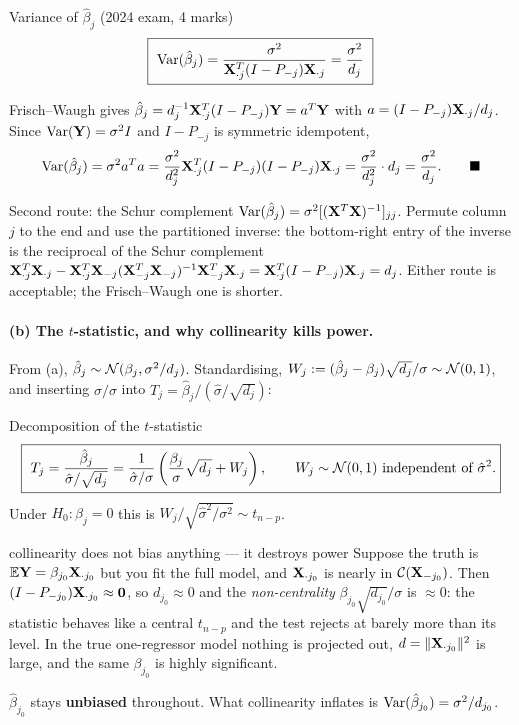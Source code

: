\documentclass[11pt]{article}
\begin{document}
\begin{idea}{Variance of $\hat\beta_j$ (2024 exam, 4 marks)}
\[
  \boxed{\ \Var(\hat\beta_j)=\frac{\sigma^2}{\bX_{\cdot j}^T(I-P_{-j})\bX_{\cdot j}}=\frac{\sigma^2}{d_j}\ }
\]
\end{idea}

\prf Frisch--Waugh gives $\hat\beta_j=d_j^{-1}\mathbf{X}_{\cdot j}^T(I-P_{-j})\mathbf{Y}=a^T\mathbf{Y}$ with
$a=(I-P_{-j})\mathbf{X}_{\cdot j}/d_j$. Since $\operatorname{Var}(\mathbf{Y})=\sigma^2I$ and $I-P_{-j}$ is symmetric
idempotent,
\[
  \operatorname{Var}(\hat\beta_j)=\sigma^2a^Ta
  =\frac{\sigma^2}{d_j^2}\mathbf{X}_{\cdot j}^T(I-P_{-j})(I-P_{-j})\mathbf{X}_{\cdot j}
  =\frac{\sigma^2}{d_j^2}\cdot d_j=\frac{\sigma^2}{d_j}. \qquad\blacksquare
\]

\begin{idea}{Second route: the Schur complement}
$\operatorname{Var}(\hat\beta_j)=\sigma^2[(\mathbf{X}^T\mathbf{X})^{-1}]_{jj}$. Permute column $j$ to the end and use the
partitioned inverse: the bottom-right entry of the inverse is the reciprocal of the Schur
complement
$\mathbf{X}_{\cdot j}^T\mathbf{X}_{\cdot j}-\mathbf{X}_{\cdot j}^T\mathbf{X}_{-j}(\mathbf{X}_{-j}^T\mathbf{X}_{-j})^{-1}\mathbf{X}_{-j}^T\mathbf{X}_{\cdot j}
=\mathbf{X}_{\cdot j}^T(I-P_{-j})\mathbf{X}_{\cdot j}=d_j$. Either route is acceptable; the Frisch--Waugh
one is shorter.
\end{idea}

\paragraph{(b) The $t$-statistic, and why collinearity kills power.}
From (a), $\hat\beta_j\sim\mathcal{N}(\beta_j,\sigma^2/d_j)$. Standardising,
$W_j:=(\hat\beta_j-\beta_j)\sqrt{d_j}/\sigma\sim\mathcal{N}(0,1)$, and inserting $\sigma/\sigma$ into
$T_j=\hat\beta_j/(\hat\sigma/\sqrt{d_j})$:

\begin{idea}{Decomposition of the $t$-statistic}
\[
  \boxed{\ T_j=\frac{\hat\beta_j}{\hat\sigma/\sqrt{d_j}}
   =\frac{1}{\hat\sigma/\sigma}\left(\frac{\beta_j}{\sigma}\sqrt{d_j}+W_j\right),\qquad
   W_j\sim\N(0,1)\ \text{independent of}\ \hat\sigma^2. }
\]
Under $H_0:\beta_j=0$ this is $W_j/\sqrt{\hat\sigma^2/\sigma^2}\sim t_{n-p}$.
\end{idea}

\begin{confusion}{collinearity does not bias anything --- it destroys power}
Suppose the truth is $\mathbb{E}\mathbf{Y}=\beta_{j_0}\mathbf{X}_{\cdot j_0}$ but you fit the full model, and
$\mathbf{X}_{\cdot j_0}$ is nearly in $\mathcal{C}(\mathbf{X}_{-j_0})$. Then
$(I-P_{-j_0})\mathbf{X}_{\cdot j_0}\approx\mathbf{0}$, so $d_{j_0}\approx0$ and the \emph{non-centrality}
$\beta_{j_0}\sqrt{d_{j_0}}/\sigma$ is $\approx0$: the statistic behaves like a central
$t_{n-p}$ and the test rejects at barely more than its level. In the true one-regressor
model nothing is projected out, $d=\|\mathbf{X}_{\cdot j_0}\|^2$ is large, and the same $\beta_{j_0}$
is highly significant.

$\hat\beta_{j_0}$ stays \textbf{unbiased} throughout. What collinearity inflates is
$\operatorname{Var}(\hat\beta_{j_0})=\sigma^2/d_{j_0}$.
\end{confusion}
\end{document}
